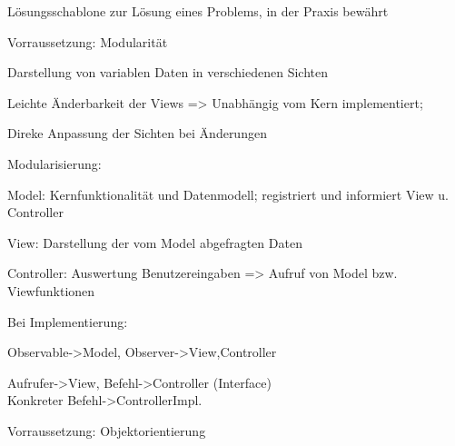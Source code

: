 Lösungsschablone zur Lösung eines Problems, in der Praxis bewährt

Vorraussetzung: Modularität

Darstellung von variablen Daten in verschiedenen Sichten

Leichte Änderbarkeit der Views => Unabhängig vom Kern implementiert;

Direke Anpassung der Sichten bei Änderungen

Modularisierung:

Model: Kernfunktionalität und Datenmodell; registriert und informiert View u. Controller

View: Darstellung der vom Model abgefragten Daten

Controller: Auswertung Benutzereingaben => Aufruf von Model bzw. Viewfunktionen

Bei Implementierung: 

 Observable->Model, Observer->View,Controller

 Aufrufer->View, Befehl->Controller (Interface) \\Konkreter Befehl->ControllerImpl.

Vorraussetzung: Objektorientierung



